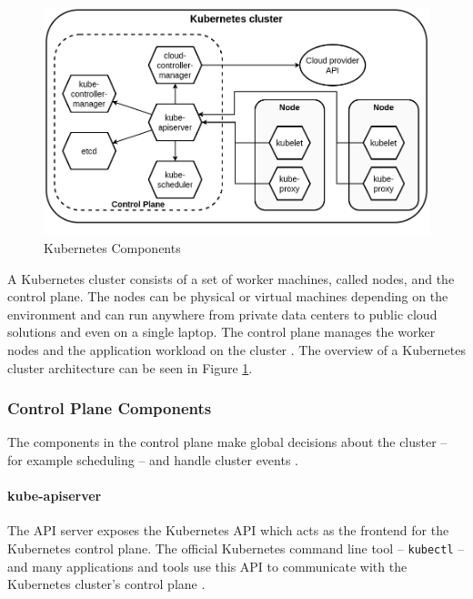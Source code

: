 \begin{figure}[h]
	\centering
	\includegraphics[width=130mm, keepaspectratio]{figures/kubernetes_components.png}
	\caption{Kubernetes Components \cite{KubernetesArchitecture}}
	\label{fig:kubernetes_components}
\end{figure}


A Kubernetes cluster consists of a set of worker machines, called nodes, and the control plane. The nodes can be physical or virtual machines depending on the environment and can run anywhere from private data centers to public cloud solutions and even on a single laptop. The control plane manages the worker nodes and the application workload on the cluster \cite{KubernetesArchitecture}. The overview of a Kubernetes cluster architecture can be seen in Figure \ref{fig:kubernetes_components}.

\subsubsection{Control Plane Components} \label{background-kubernetes-control-plane}

The components in the control plane make global decisions about the cluster -- for example scheduling -- and handle cluster events \cite{KubernetesArchitecture}. 

\paragraph{kube-apiserver} The API server exposes the Kubernetes API which acts as the frontend for the Kubernetes control plane. The official Kubernetes command line tool -- \texttt{kubectl} -- and many applications and tools use this API to communicate with the Kubernetes cluster's control plane \cite{KubernetesArchitecture}.

